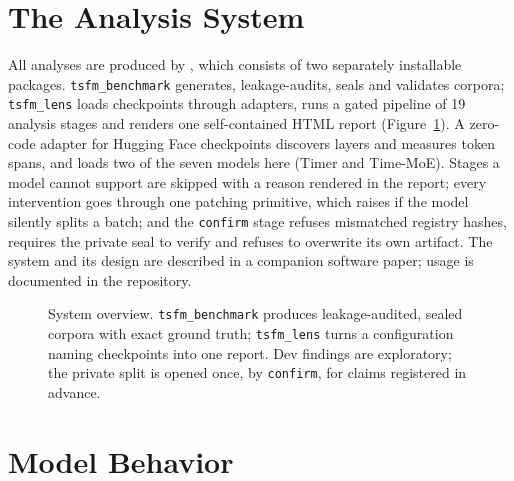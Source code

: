 \section{The Analysis System}
\label{app:system}

All analyses are produced by \tool{}, which consists of two separately installable packages. \texttt{tsfm\_benchmark}
generates, leakage-audits, seals and validates corpora; \texttt{tsfm\_lens} loads checkpoints through adapters, runs a
gated pipeline of 19 analysis stages and renders one self-contained HTML report (Figure~\ref{fig:overview}). A zero-code
adapter for Hugging Face checkpoints discovers layers and measures token spans, and loads two of the seven models here
(Timer and Time-MoE). Stages a model cannot support are skipped with a reason rendered in the report; every intervention
goes through one patching primitive, which raises if the model silently splits a batch; and the \texttt{confirm} stage
refuses mismatched registry hashes, requires the private seal to verify and refuses to overwrite its own artifact. The
system and its design are described in a companion software paper; usage is documented in the repository.

\begin{figure}[!tb]
\centering

\caption{System overview. \texttt{tsfm\_benchmark} produces leakage-audited, sealed corpora with exact ground truth;
\texttt{tsfm\_lens} turns a configuration naming checkpoints into one report. Dev findings are exploratory; the private
split is opened once, by \texttt{confirm}, for claims registered in advance.}
\label{fig:overview}
\end{figure}

\section{Model Behavior}
\label{app:behavior}

